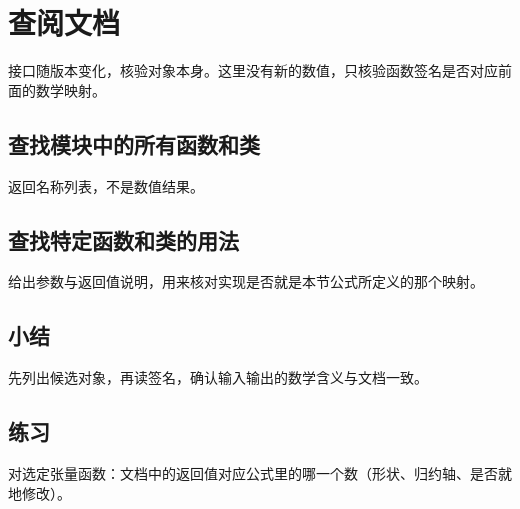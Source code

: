 \section{查阅文档}

接口随版本变化，核验对象本身。这里没有新的数值，只核验函数签名是否对应前面的数学映射。

\subsection{查找模块中的所有函数和类}

 返回名称列表，不是数值结果。

\subsection{查找特定函数和类的用法}

 给出参数与返回值说明，用来核对实现是否就是本节公式所定义的那个映射。

\subsection{小结}

先列出候选对象，再读签名，确认输入输出的数学含义与文档一致。

\subsection{练习}

对选定张量函数：文档中的返回值对应公式里的哪一个数（形状、归约轴、是否就地修改）。
